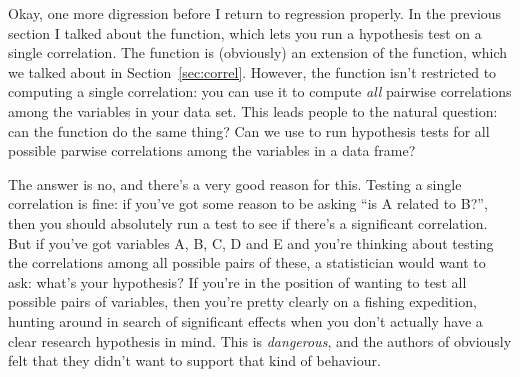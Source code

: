 
Okay, one more digression before I return to regression properly. In the previous section I talked about the  function, which lets you run a hypothesis test on a single correlation. The  function is (obviously) an extension of the  function, which we talked about in Section~\ref{sec:correl}. However, the  function isn't restricted to computing a single correlation: you can use it to compute {\it all} pairwise correlations among the variables in your data set. This leads people to the natural question: can the  function do the same thing? Can we use  to run hypothesis tests for all possible parwise correlations among the variables in a data frame?

The answer is no, and there's a very good reason for this. Testing a single correlation is fine: if you've got some reason to be asking ``is A related to B?'', then you should absolutely run a test to see if there's a significant correlation. But if you've got variables A, B, C, D and E and you're thinking about testing the correlations among all possible pairs of these, a statistician would want to ask: what's your hypothesis? If you're in the position of wanting to test all possible pairs of variables, then you're pretty clearly on a fishing expedition, hunting around in search of significant effects when you don't actually have a clear research hypothesis in mind. This is {\it dangerous}, and the authors of  obviously felt that they didn't want to support that kind of behaviour.

